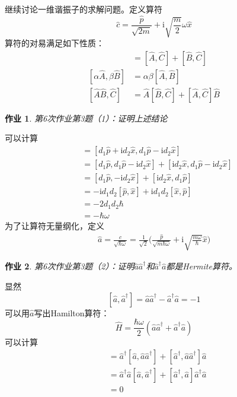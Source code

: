 \documentclass[12pt]{article}
\newtheorem{asg}{作业}
\begin{document}
继续讨论一维谐振子的求解问题。定义算符
\[ \hat{c} = \frac {\hat{p}}{\sqrt{2m}} + \mathrm{i}\sqrt{\frac m2}\omega \hat{x} \]
算符的对易满足如下性质：
\begin{align*}
    [\hat{A}+\hat{B},\hat{C}] &= [\hat{A},\hat{C}]+[\hat{B},\hat{C}]\\
    [\alpha \hat{A}, \beta \hat{B}] &= \alpha \beta [\hat{A},\hat{B}]\\
    [\hat{A}\hat{B},\hat{C}] &= \hat{A}[\hat{B},\hat{C}] + [\hat{A},\hat{C}]\hat{B}
\end{align*}
\begin{asg}
    第6次作业第3题（1）：证明上述结论
\end{asg}
可以计算
\begin{align*}
    [\hat{c},\hat{c}^\dagger] &= [d_1\hat{p} +\mathrm{i}d_2\hat{x}, d_1\hat{p} - \mathrm{i}d_2\hat{x}]\\
    &= [d_1\hat{p}, d_1\hat{p} - \mathrm{i}d_2\hat{x}] + [\mathrm{i}d_2\hat{x}, d_1\hat{p} - \mathrm{i}d_2\hat{x}]\\
    &= [d_1\hat{p}, -\mathrm{i}d_2\hat{x}] + [\mathrm{i}d_2\hat{x}, d_1\hat{p}]\\
    &= -\mathrm{i}d_1d_2[\hat{p},\hat{x}] + \mathrm{i}d_1d_2[\hat{x},\hat{p}]\\
    &= -2d_1d_2\hbar\\
    &= -\hbar \omega
\end{align*}
为了让算符无量纲化，定义
\begin{align*}
    \hat{a} = \frac {\hat{c}}{\sqrt{\hbar \omega}} =\frac 1{\sqrt{2}} \bigg(\frac {\hat{p}}{\sqrt{m\hbar\omega}} + \mathrm{i}\sqrt{\frac {m\omega}{\hbar}} \hat{x}\bigg)
\end{align*}
\begin{asg}
    第6次作业第3题（2）：证明$\hat{a}\hat{a}^\dagger$和$\hat{a}^\dagger\hat{a}$都是Hermite算符。
\end{asg}
显然
\[ [\hat{a},\hat{a}^\dagger] = \hat{a}\hat{a}^\dagger - \hat{a}^\dagger \hat{a} =  -1 \]
可以用$\hat{a}$写出Hamilton算符：
\[ \hat{H} = \frac {\hbar \omega}2 (\hat{a}\hat{a}^\dagger + \hat{a}^\dagger \hat{a}) \]
可以计算
\begin{align*}
    [\hat{a}^\dagger\hat{a}, \hat{a}\hat{a}^\dagger] &= \hat{a}^\dagger [\hat{a},\hat{a}\hat{a}^\dagger] +  [\hat{a}^\dagger,\hat{a}\hat{a}^\dagger]\hat{a}\\
    &= \hat{a}^\dagger\hat{a}[\hat{a},\hat{a}^\dagger] + [\hat{a}^\dagger,\hat{a}]\hat{a}^\dagger \hat{a}\\
    &= 0
\end{align*}
\end{document}
